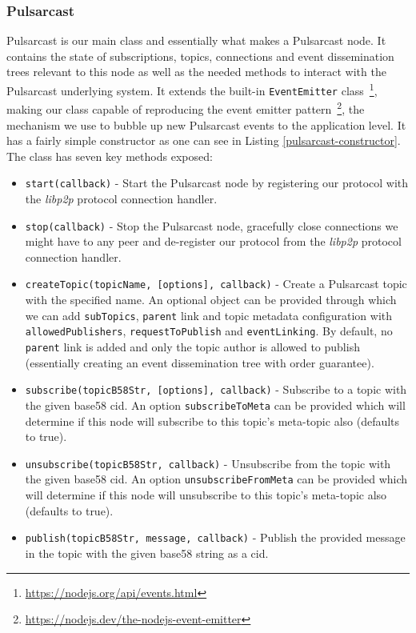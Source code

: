\subsubsection{Pulsarcast}\label{subsubsec:pulsarcast}

Pulsarcast is our main class and essentially what makes a Pulsarcast node. It
contains the state of subscriptions, topics, connections and event
dissemination trees relevant to this node as well as the needed methods to
interact with the Pulsarcast underlying system. It extends the built-in
\verb|EventEmitter| class~\footnote{\url{https://nodejs.org/api/events.html}},
making our class capable of reproducing the event emitter
pattern~\footnote{\url{https://nodejs.dev/the-nodejs-event-emitter}}, the
mechanism we use to bubble up new Pulsarcast events to the application level.
It has a fairly simple constructor as one can see in Listing
\ref{pulsarcast-constructor}. The class has seven key methods exposed:

\begin{itemize}
  \item
    \verb|start(callback)| -  Start the Pulsarcast node by registering our protocol with the \emph{libp2p} protocol connection handler.
  \item
    \verb|stop(callback)| - Stop the Pulsarcast node, gracefully close connections we might have to any peer and de-register our protocol from the \emph{libp2p} protocol connection handler.
  \item
  \verb|createTopic(topicName, [options], callback)| - Create a Pulsarcast topic with the specified name. An optional object can be provided through which we can add \verb|subTopics|, \verb|parent| link and topic metadata configuration with \verb|allowedPublishers|, \verb|requestToPublish| and \verb|eventLinking|. By default, no \verb|parent| link is added and only the topic author is allowed to publish (essentially creating an event dissemination tree with order guarantee).
  \item
    \verb|subscribe(topicB58Str, [options], callback)| - Subscribe to a topic with the given base58 \acrshort{cid}. An option \verb|subscribeToMeta| can be provided which will determine if this node will subscribe to this topic's meta-topic also (defaults to true).
  \item
    \verb|unsubscribe(topicB58Str, callback)| - Unsubscribe from the topic with the given base58 \acrshort{cid}. An option \verb|unsubscribeFromMeta| can be provided which will determine if this node will unsubscribe to this topic's meta-topic also (defaults to true).
  \item
    \verb|publish(topicB58Str, message, callback)| - Publish the provided message in the topic with the given base58 string as a \acrshort{cid}.
\end{itemize}

